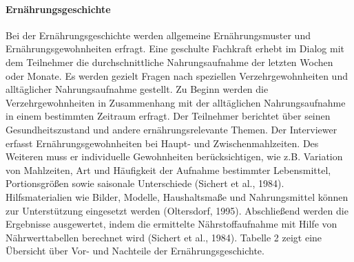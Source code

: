 \paragraph{Ernährungsgeschichte}
Bei der Ernährungsgeschichte werden allgemeine Ernährungsmuster und Ernährungsgewohnheiten erfragt. Eine geschulte Fachkraft erhebt im Dialog mit dem Teilnehmer die durchschnittliche Nahrungsaufnahme der letzten Wochen oder Monate. Es werden gezielt Fragen nach speziellen Verzehrgewohnheiten und alltäglicher Nahrungsaufnahme gestellt. Zu Beginn werden die Verzehrgewohnheiten in Zusammenhang mit der alltäglichen Nahrungsaufnahme in einem bestimmten Zeitraum erfragt. Der Teilnehmer berichtet über  seinen Gesundheitszustand und andere ernährungsrelevante Themen. Der Interviewer erfasst Ernährungsgewohnheiten bei Haupt- und Zwischenmahlzeiten. Des Weiteren muss er individuelle Gewohnheiten berücksichtigen, wie z.B. Variation von Mahlzeiten, Art und Häufigkeit der Aufnahme bestimmter Lebensmittel, Portionsgrößen sowie saisonale Unterschiede (Sichert et al., 1984). Hilfsmaterialien wie Bilder, Modelle, Haushaltsmaße und Nahrungsmittel können zur Unterstützung eingesetzt werden (Oltersdorf, 1995). Abschließend werden die Ergebnisse ausgewertet, indem die ermittelte Nährstoffaufnahme mit Hilfe von Nährwerttabellen berechnet wird (Sichert et al., 1984). 
Tabelle 2 zeigt eine Übersicht über Vor- und Nachteile der Ernährungsgeschichte.



